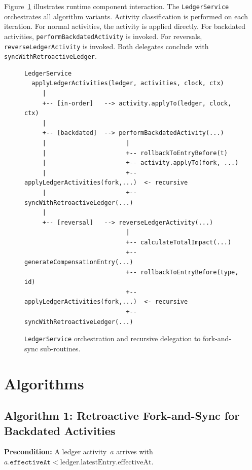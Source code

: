 \documentclass[11pt,letterpaper]{article}
\begin{document}
Figure~\ref{fig:orchestration} illustrates runtime component
interaction. The \texttt{LedgerService} orchestrates all algorithm
variants. Activity classification is performed on each iteration. For
normal activities, the activity is applied directly. For backdated
activities, \texttt{performBackdatedActivity} is invoked. For
reversals, \texttt{reverseLedgerActivity} is invoked. Both delegates
conclude with \texttt{syncWithRetroactiveLedger}.

\begin{figure}[h!]
\begin{lstlisting}
LedgerService
  applyLedgerActivities(ledger, activities, clock, ctx)
     |
     +-- [in-order]   --> activity.applyTo(ledger, clock, ctx)
     |
     +-- [backdated]  --> performBackdatedActivity(...)
     |                      |
     |                      +-- rollbackToEntryBefore(t)
     |                      +-- activity.applyTo(fork, ...)
     |                      +-- applyLedgerActivities(fork,...)  <- recursive
     |                      +-- syncWithRetroactiveLedger(...)
     |
     +-- [reversal]   --> reverseLedgerActivity(...)
                            |
                            +-- calculateTotalImpact(...)
                            +-- generateCompensationEntry(...)
                            +-- rollbackToEntryBefore(type, id)
                            +-- applyLedgerActivities(fork,...)  <- recursive
                            +-- syncWithRetroactiveLedger(...)
\end{lstlisting}
\caption{\texttt{LedgerService} orchestration and recursive delegation
to fork-and-sync sub-routines.}
\label{fig:orchestration}
\end{figure}

\section{Algorithms}
\label{sec:algorithms}

\subsection{Algorithm 1: Retroactive Fork-and-Sync for Backdated Activities}
\label{sec:alg-backdated}

\textbf{Precondition:} A ledger activity~$a$ arrives with
$a.\texttt{effectiveAt} < \text{ledger.latestEntry.effectiveAt}$.
\end{document}
